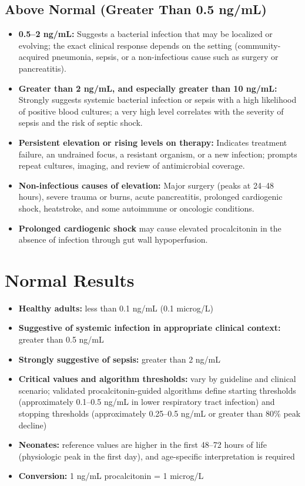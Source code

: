 \subsection*{Above Normal (Greater Than 0.5 ng/mL)}
\begin{itemize}
  \item \textbf{0.5--2 ng/mL:} Suggests a bacterial infection that may be localized or evolving; the exact clinical response depends on the setting (community-acquired pneumonia, sepsis, or a non-infectious cause such as surgery or pancreatitis).
  \item \textbf{Greater than 2 ng/mL, and especially greater than 10 ng/mL:} Strongly suggests systemic bacterial infection or sepsis with a high likelihood of positive blood cultures; a very high level correlates with the severity of sepsis and the risk of septic shock.
  \item \textbf{Persistent elevation or rising levels on therapy:} Indicates treatment failure, an undrained focus, a resistant organism, or a new infection; prompts repeat cultures, imaging, and review of antimicrobial coverage.
  \item \textbf{Non-infectious causes of elevation:} Major surgery (peaks at 24--48 hours), severe trauma or burns, acute pancreatitis, prolonged cardiogenic shock, heatstroke, and some autoimmune or oncologic conditions.
  \item \textbf{Prolonged cardiogenic shock} may cause elevated procalcitonin in the absence of infection through gut wall hypoperfusion.
\end{itemize}

\section*{Normal Results}
\begin{itemize}
  \item \textbf{Healthy adults:} less than 0.1 ng/mL (0.1 microg/L)
  \item \textbf{Suggestive of systemic infection in appropriate clinical context:} greater than 0.5 ng/mL
  \item \textbf{Strongly suggestive of sepsis:} greater than 2 ng/mL
  \item \textbf{Critical values and algorithm thresholds:} vary by guideline and clinical scenario; validated procalcitonin-guided algorithms define starting thresholds (approximately 0.1--0.5 ng/mL in lower respiratory tract infection) and stopping thresholds (approximately 0.25--0.5 ng/mL or greater than 80\% peak decline)
  \item \textbf{Neonates:} reference values are higher in the first 48--72 hours of life (physiologic peak in the first day), and age-specific interpretation is required
  \item \textbf{Conversion:} 1 ng/mL procalcitonin = 1 microg/L
\end{itemize}

